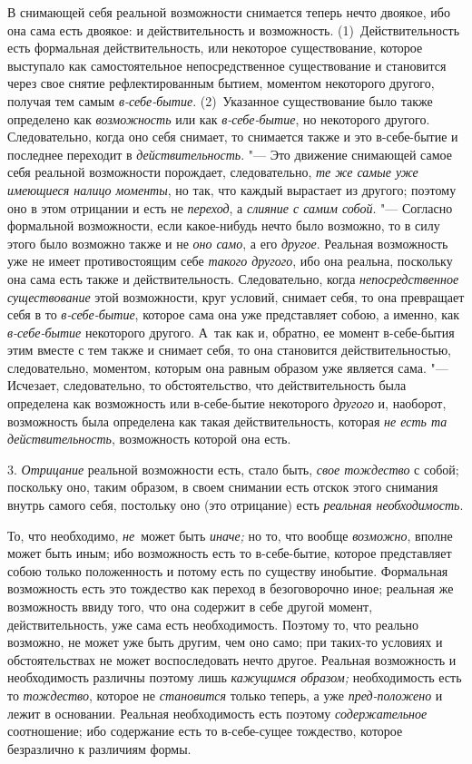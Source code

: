 В снимающей себя реальной возможности снимается теперь нечто двоякое, ибо
она сама есть двоякое: и действительность и возможность.
(1)~Действительность есть формальная действительность, или некоторое
существование, которое выступало как самостоятельное непосредственное
существование и становится через свое снятие рефлектированным бытием,
моментом некоторого другого, получая тем самым
{\em в-себе-бытие}. (2)~Указанное существование было
также определено как {\em возможность} или как
{\em в-себе-бытие}, но некоторого другого.
Следовательно, когда оно себя снимает, то снимается также и это
в-себе-бытие и последнее переходит в
{\em действительность}. "--- Это движение снимающей самое
себя реальной возможности порождает, следовательно,
{\em те же самые уже имеющиеся налицо моменты}, но так,
что каждый вырастает из другого; поэтому оно в этом отрицании и есть не
{\em переход}, а {\em слияние с
самим собой}. "--- Согласно формальной возможности, если какое-нибудь нечто
было возможно, то в силу этого было возможно также и не
{\em оно само}, а его {\em другое}.
Реальная возможность уже не имеет противостоящим себе
{\em такого другого}, ибо она реальна, поскольку она
сама есть также и действительность. Следовательно, когда
{\em непосредственное существование} этой возможности,
круг условий, снимает себя, то она превращает себя в то
{\em в-себе-бытие}, которое сама она уже представляет
собою, а именно, как {\em в-себе-бытие} некоторого
другого. А~так как и, обратно, ее момент в-себе-бытия этим вместе с тем
также и снимает себя, то она становится действительностью, следовательно,
моментом, которым она равным образом уже является сама. "--- Исчезает,
следовательно, то обстоятельство, что действительность была определена как
возможность или в-себе-бытие некоторого {\em другого}
и, наоборот, возможность была определена как такая действительность,
которая {\em не есть та действительность}, возможность
которой она есть.

3. {\em Отрицание} реальной возможности есть, стало
быть, {\em свое тождество} с собой; поскольку оно,
таким образом, в своем снимании есть отскок этого снимания внутрь самого
себя, постольку оно (это отрицание) есть {\em реальная
необходимость}.

То, что необходимо, {\em не}~может быть {\em иначе;} но то, что вообще
{\em возможно}, вполне может быть иным; ибо возможность
есть то в-себе-бытие, которое представляет собою только положенность и
потому есть по существу инобытие. Формальная возможность есть это тождество
как переход в безоговорочно иное; реальная же возможность ввиду того, что
она содержит в себе другой момент, действительность, уже сама есть
необходимость. Поэтому то, что реально возможно, не может уже быть другим,
чем оно само; при таких-то условиях и обстоятельствах не может
воспоследовать нечто другое. Реальная возможность и необходимость различны
поэтому лишь {\em кажущимся образом;} необходимость есть то {\em тождество},
которое не {\em становится} только теперь, а уже {\em пред-положено} и лежит
в основании. Реальная необходимость есть поэтому {\em содержательное}
соотношение; ибо содержание есть то в-себе-сущее тождество, которое
безразлично к различиям формы.

